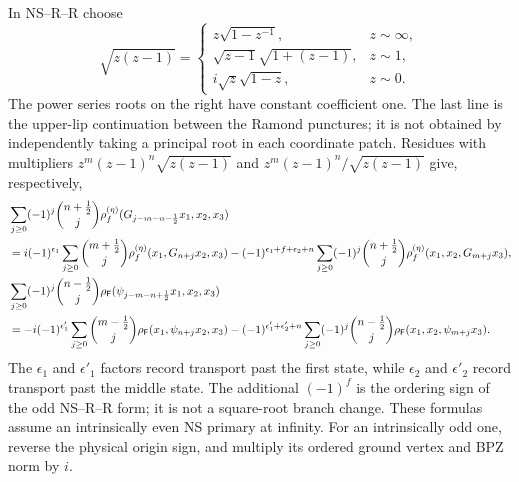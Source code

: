 In NS--R--R choose
\begin{equation}
 \sqrt{z(z-1)}=
 \begin{cases}
 z\sqrt{1-z^{-1}},&z\sim\infty,\\
 \sqrt{z-1}\sqrt{1+(z-1)},&z\sim1,\\
 i\sqrt z\sqrt{1-z},&z\sim0.
 \end{cases}
 \label{eq:app-contour-root}
\end{equation}
The power series roots on the right have constant coefficient one.
The last line is the upper-lip continuation between the Ramond punctures;
it is not obtained by independently taking a principal root in each
coordinate patch. Residues with multipliers
$z^m(z-1)^n\sqrt{z(z-1)}$ and
$z^m(z-1)^n/\sqrt{z(z-1)}$ give, respectively,
\begin{align}
 &\sum_{j\ge0}(-1)^j\binom{n+\frac12}{j}
 \rho_f^{(\eta)}(G_{j-m-n-\frac12}x_1,x_2,x_3)\nonumber\\
 &=i(-1)^{\epsilon_1}\sum_{j\ge0}\binom{m+\frac12}{j}
 \rho_f^{(\eta)}(x_1,G_{n+j}x_2,x_3)
 -(-1)^{\epsilon_1+f+\epsilon_2+n}
       \sum_{j\ge0}(-1)^j\binom{n+\frac12}{j}
 \rho_f^{(\eta)}(x_1,x_2,G_{m+j}x_3),
 \label{eq:app-r-g-ward}\\
 &\sum_{j\ge0}(-1)^j\binom{n-\frac12}{j}
 \rho_{\mathsf F}(\psi_{j-m-n+\frac12}x_1,x_2,x_3)\nonumber\\
 &=-i(-1)^{\epsilon'_1}\sum_{j\ge0}\binom{m-\frac12}{j}
 \rho_{\mathsf F}(x_1,\psi_{n+j}x_2,x_3)
 -(-1)^{\epsilon'_1+\epsilon'_2+n}
       \sum_{j\ge0}(-1)^j\binom{n-\frac12}{j}
 \rho_{\mathsf F}(x_1,x_2,\psi_{m+j}x_3).
 \label{eq:app-r-psi-ward}
\end{align}
The $\epsilon_1$ and $\epsilon'_1$ factors record transport past the
first state, while $\epsilon_2$ and $\epsilon'_2$ record transport past
the middle state. The additional $(-1)^f$ is the ordering sign of the
odd NS--R--R form; it is not a square-root branch change.
These formulas assume an intrinsically even NS primary at infinity.
For an intrinsically odd one, reverse the physical origin sign,
and multiply its ordered ground vertex and BPZ norm by $i$.

